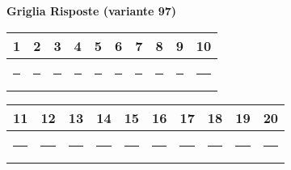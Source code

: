 \documentclass{exam}%
\newcounter{variant}%
\begin{document}
%
\normalsize%
\setcounter{variant}{97}%
\noindent \textbf{  }%
\bigskip%
\noindent\textbf{Griglia Risposte (variante 97)}%
\begin{center}
\begin{tabular}{|c|c|c|c|c|c|c|c|c|c|}
\hline
1 & 2 & 3 & 4 & 5 & 6 & 7 & 8 & 9 & 10 \\ \hline
\rule{1cm}{0pt}\rule[-0.5em]{0pt}{1.5em} & \rule{1cm}{0pt}\rule[-0.5em]{0pt}{1.5em} & \rule{1cm}{0pt}\rule[-0.5em]{0pt}{1.5em} & \rule{1cm}{0pt}\rule[-0.5em]{0pt}{1.5em} & \rule{1cm}{0pt}\rule[-0.5em]{0pt}{1.5em} & \rule{1cm}{0pt}\rule[-0.5em]{0pt}{1.5em} & \rule{1cm}{0pt}\rule[-0.5em]{0pt}{1.5em} & \rule{1cm}{0pt}\rule[-0.5em]{0pt}{1.5em} & \rule{1cm}{0pt}\rule[-0.5em]{0pt}{1.5em} & \rule{1cm}{0pt}\rule[-0.5em]{0pt}{1.5em} \\ \hline
\end{tabular}
\end{center}%
\vspace{0.3em}%
\begin{center}
\begin{tabular}{|c|c|c|c|c|c|c|c|c|c|}
\hline
11 & 12 & 13 & 14 & 15 & 16 & 17 & 18 & 19 & 20 \\ \hline
\rule{1cm}{0pt}\rule[-0.5em]{0pt}{1.5em} & \rule{1cm}{0pt}\rule[-0.5em]{0pt}{1.5em} & \rule{1cm}{0pt}\rule[-0.5em]{0pt}{1.5em} & \rule{1cm}{0pt}\rule[-0.5em]{0pt}{1.5em} & \rule{1cm}{0pt}\rule[-0.5em]{0pt}{1.5em} & \rule{1cm}{0pt}\rule[-0.5em]{0pt}{1.5em} & \rule{1cm}{0pt}\rule[-0.5em]{0pt}{1.5em} & \rule{1cm}{0pt}\rule[-0.5em]{0pt}{1.5em} & \rule{1cm}{0pt}\rule[-0.5em]{0pt}{1.5em} & \rule{1cm}{0pt}\rule[-0.5em]{0pt}{1.5em} \\ \hline
\end{tabular}
\end{center}%
\vspace{1em}%
\end{document}
